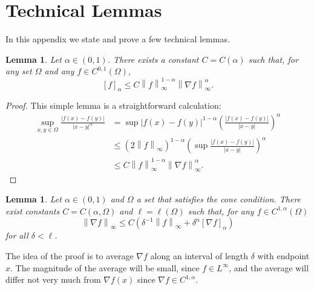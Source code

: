 \documentclass[11pt]{amsart}
\newtheorem{lemma}[theorem]{Lemma}
\theoremstyle{remark}
\theoremstyle{definition}
\newcommand{\norm}[1]{\left\lVert#1\right\rVert}
\newcommand{\paren}[1]{\left( #1 \right)}
\newcommand{\bracket}[1]{\left[ #1 \right]}
\newcommand{\grad}{\nabla}
\newcommand{\n}{^{-1}}
\begin{document}
\vskip1cm
\appendix
\section{Technical Lemmas} \label{sec:technical}

In this appendix we state and prove a few technical lemmas.  


\begin{lemma} \label{thm:interpolation C1 to holder}
Let $\alpha \in (0,1)$.  There exists a constant $C = C(\alpha)$ such that, for any set $\Omega$ and any $f \in C^{0,1}(\Omega)$,
\[ \bracket{f}_\alpha \leq C \norm{f}_\infty^{1-\alpha} \norm{\grad f}_\infty^\alpha. \]
\end{lemma}

\begin{proof}
This simple lemma is a straightforward calculation:
\begin{align*} 
\sup_{x,y \in \Omega} \frac{|f(x)-f(y)|}{|x-y|^\alpha} &= \sup |f(x)-f(y)|^{1-\alpha} \paren{\frac{|f(x)-f(y)|}{|x-y|}}^\alpha 
\\ &\leq \paren{2 \norm{f}_\infty}^{1-\alpha} \paren{ \sup \frac{|f(x)-f(y)|}{|x-y|} }^\alpha
\\ &\leq C \norm{f}_\infty^{1-\alpha} \norm{\grad f}_\infty^\alpha.
\end{align*}
\end{proof}

\begin{lemma} \label{thm:interpolation holder to C1}
Let $\alpha \in (0,1)$ and $\Omega$ a set that satisfies the cone condition.  There exist constants $C = C(\alpha, \Omega)$ and $\ell = \ell(\Omega)$ such that, for any $f \in C^{1,\alpha}(\Omega)$
\[ \norm{\grad f}_\infty \leq C \paren{ \delta\n \norm{f}_\infty  + \delta^\alpha \bracket{\grad f}_\alpha }\]
for all $\delta < \ell$.  
\end{lemma}

The idea of the proof is to average $\grad f$ along an interval of length $\delta$ with endpoint $x$.  The magnitude of the average will be small, since $f \in L^\infty$, and the average will differ not very much from $\grad f(x)$ since $\grad f \in C^{1,\alpha}$.  
\end{document}
